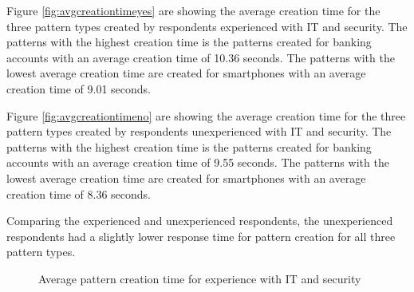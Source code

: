      Figure \ref{fig:avgcreationtimeyes} are showing the average creation time for the three pattern types created by respondents experienced with IT and security. The patterns with the highest creation time is the patterns created for banking accounts with an average creation time of 10.36 seconds. The patterns with the lowest average creation time are created for smartphones with an average creation time of 9.01 seconds.

      Figure \ref{fig:avgcreationtimeno} are showing the average creation time for the three pattern types created by respondents unexperienced with IT and security. The patterns with the highest creation time is the patterns created for banking accounts with an average creation time of 9.55 seconds. The patterns with the lowest average creation time are created for smartphones with an average creation time of 8.36 seconds.

      Comparing the experienced and unexperienced respondents, the unexperienced respondents had a slightly lower response time for pattern creation for all three pattern types. 

      \begin{figure}[H]
        \centering
        \caption{Average pattern creation time for experience with IT and security}
        \label{fig:avgcreationtimeexperience}
      \end{figure}

